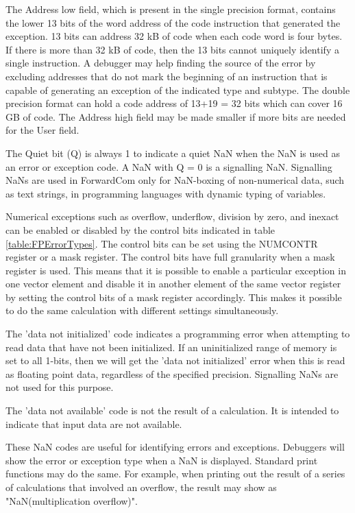 \documentclass[forwardcom.tex]{subfiles}
\begin{document}
The Address low field, which is present in the single precision format, contains the lower 13 bits of the word address of the code instruction that generated the exception. 13 bits can address 32 kB of code when each code word is four bytes. If there is more than 32 kB of code, then the 13 bits cannot uniquely identify a single instruction. A debugger may help finding the source of the error by excluding addresses that do not mark the beginning of an instruction that is capable of generating an exception of the indicated type and subtype. The double precision format can hold a code address of 13+19 = 32 bits which can cover 16 GB of code. The Address high field may be made smaller if more bits are needed for the User field.
\vv

The Quiet bit (Q) is always 1 to indicate a quiet NaN when the NaN is used as an error or exception code. A NaN with Q = 0 is a signalling NaN. Signalling NaNs are used in ForwardCom only for NaN-boxing of non-numerical data, such as text strings, in programming languages with dynamic typing of variables.
\vv

Numerical exceptions such as overflow, underflow, division by zero, and inexact can be enabled or disabled by the control bits indicated in table \ref{table:FPErrorTypes}. The control bits can be set using the NUMCONTR register or a mask register.
The control bits have full granularity when a mask register is used. This means that it is possible to enable a particular exception in one vector element and disable it in another element of the same vector register by setting the control bits of a mask register accordingly. This makes it possible to do the same calculation with different settings simultaneously.
\vv

The 'data not initialized' code indicates a programming error when attempting to read data that have not been initialized. If an uninitialized range of memory is set to all 1-bits, then we will get the 'data not initialized' error when this is read as floating point data, regardless of the specified precision. Signalling NaNs are not used for this purpose.
\vv

The 'data not available' code is not the result of a calculation. It is intended to indicate that input data are not available.
\vv

These NaN codes are useful for identifying errors and exceptions. Debuggers will show the error or exception type when a NaN is displayed. Standard print functions may do the same. For example, when printing out the result of a series of calculations that involved an overflow, the result may show as "NaN(multiplication overflow)".
\vv
\end{document}
